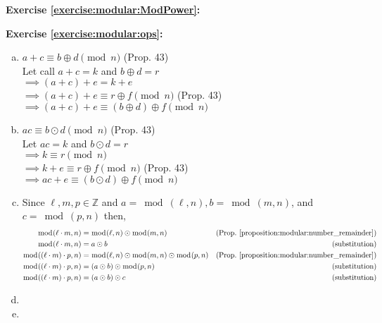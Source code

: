 \noindent\textbf{Exercise \ref{exercise:modular:ModPower}:} 

\noindent\textbf{Exercise \ref{exercise:modular:ops}:} %
\begin{enumerate}[(a)]
\item
$a+c \equiv b \oplus d \pmod{n}$ (Prop. 43)\\
Let call $a+c=k$ and $b \oplus d=r$\\
$\implies (a+c)+e=k+e$\\
$\implies (a+c)+e \equiv r \oplus f \pmod{n}$ (Prop. 43)\\
$\implies (a+c)+e \equiv (b \oplus d) \oplus f \pmod{n}$

\item
$ac \equiv b \odot d \pmod{n}$ (Prop. 43)\\
Let $ac=k$ and $b \odot d =r$\\
$\implies k \equiv r \pmod{n}$\\
$\implies k+e \equiv r \oplus f \pmod{n}$ (Prop. 43)\\
$\implies ac+e \equiv (b \odot d) \oplus f \pmod{n}$

\item
Since $\ell, m, p \in {\mathbb Z}$ and $a = \bmod(\ell,n), b = \bmod(m,n)$, and $c = \bmod(p,n)$ then,
\begin{align*}
\bmod(\ell \cdot m, n) &= \bmod(\ell, n) \odot \bmod(m,n) &\text{(Prop.~\ref{proposition:modular:number_remainder})}\\
\bmod(\ell \cdot m, n) &= a \odot b &\text{(substitution)}\\
\bmod((\ell \cdot m)\cdot p, n) &= \bmod(\ell, n) \odot \bmod(m,n) \odot \bmod(p,n) &\text{(Prop.~\ref{proposition:modular:number_remainder})}\\
\bmod((\ell \cdot m)\cdot p, n) &=  (a \odot b) \odot \bmod(p,n) &\text{(substitution)}\\
\bmod((\ell \cdot m)\cdot p, n) &=  (a \odot b) \odot c &\text{(substitution)}
\end{align*}

\item
\item
\end{enumerate}

